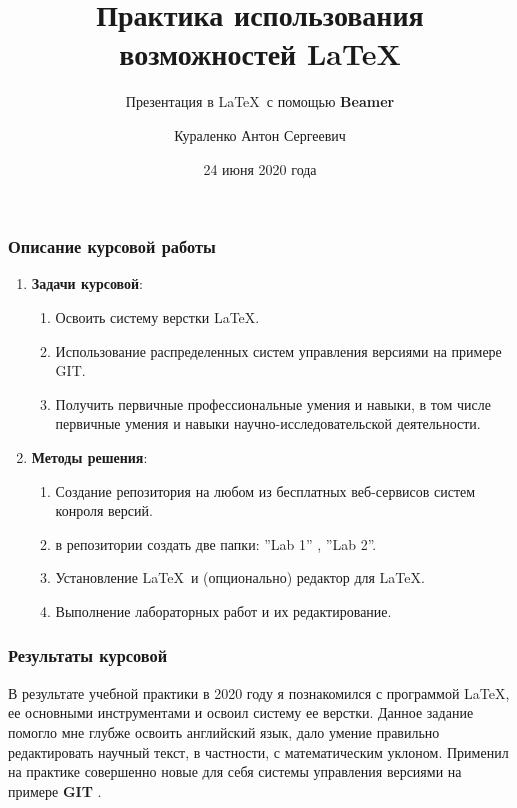 \documentclass[10pt]{beamer}
\title{Практика использования возможностей \LaTeX}
\subtitle{Презентация в \LaTeX  \ с помощью \textbf{Beamer}}
\author{Кураленко Антон Сергеевич}
\institute{Институт физико-математических наук и информационных технологий БФУ им. И. Канта}
\date{24 июня 2020 года}
\begin{document}
\begin{frame}
\titlepage
\end{frame}

\begin{frame}
	\frametitle{Описание курсовой работы}

	\begin{enumerate}
		\item {\bf Задачи курсовой}:
		\begin{enumerate}
			\item Освоить систему верстки \LaTeX.
			\item Использование распределенных систем управления версиями на примере GIT.
			\item Получить первичные профессиональные умения и навыки, в том числе первичные умения и навыки научно-исследовательской деятельности.
		\end{enumerate} 
		\item {\bf Методы решения}:
		\begin{enumerate}
			\item Создание репозитория на любом из бесплатных веб-сервисов систем конроля версий.
			\item в репозитории создать две папки: ''Lab 1'' , ''Lab 2''.
			\item Установление \LaTeX \ и (опционально) редактор для \LaTeX.
			\item Выполнение лабораторных работ и их редактирование.
		\end{enumerate} 
	\end{enumerate} 

\end{frame}

\begin{frame}
\frametitle{Результаты курсовой}
\begin{flushleft}
В результате учебной практики в 2020 году я познакомился с программой \LaTeX, ее основными инструментами и освоил систему ее верстки. Данное задание помогло мне глубже освоить английский язык, дало умение правильно редактировать научный текст, в частности, с математическим уклоном. Применил на практике совершенно новые для себя системы управления версиями на примере \textbf{GIT} .
\end{flushleft}
	
\end{frame}
\end{document}
